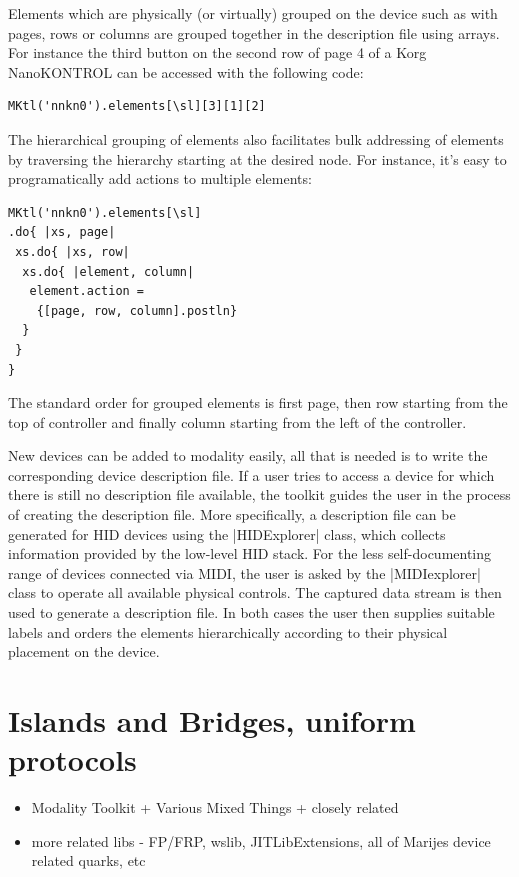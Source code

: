 \documentclass{article}
\begin{document}
Elements which are physically (or virtually) grouped on the device such as with pages, rows or columns are grouped together in the description file using arrays. For instance the third button on the second row of page 4 of a Korg NanoKONTROL can be accessed with the following code:

\begin{Verbatim}
MKtl('nnkn0').elements[\sl][3][1][2]
\end{Verbatim}

The hierarchical grouping of elements also facilitates bulk addressing of elements by traversing the hierarchy starting at the desired node. For instance, it's easy to programatically add actions to multiple elements:

\begin{Verbatim}
MKtl('nnkn0').elements[\sl]
.do{ |xs, page|
 xs.do{ |xs, row|
  xs.do{ |element, column|
   element.action = 
    {[page, row, column].postln}
  }
 }
}
\end{Verbatim}

The standard order for grouped elements is first page, then row starting from the top of controller and finally column starting from the left of the controller.

New devices can be added to modality easily, all that is needed is to write the corresponding device description file. 
If a user tries to access a device for which there is still no description file available, the toolkit guides the user in the process of creating the description file. 
More specifically, a description file can be generated for HID devices using the |HIDExplorer| class, which collects information provided by the low-level HID stack. 
For the less self-documenting range of devices connected via MIDI, the user is asked by the |MIDIexplorer| class to operate all available physical controls. 
The captured data stream is then used to generate a description file.
In both cases the user then supplies suitable labels and orders the elements hierarchically according to their physical placement on the device.

\section{Islands and Bridges, uniform protocols}
\label{sec:islands_and_bridges_uniform_protocols}


\begin{itemize}
	\item Modality Toolkit + Various Mixed Things + closely related
	\item more related libs - FP/FRP, wslib, JITLibExtensions, 
		all of Marijes device related quarks, etc 
\end{itemize}
\end{document}
